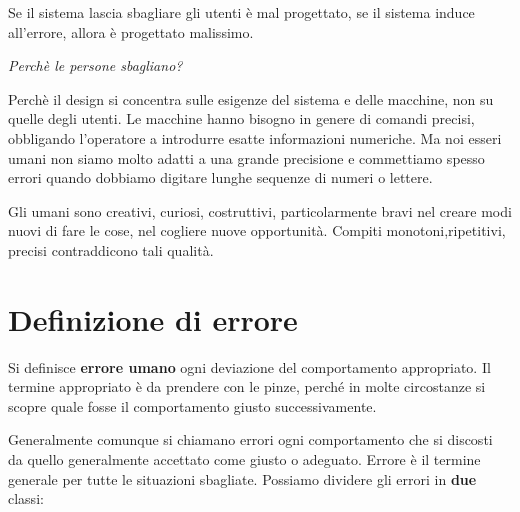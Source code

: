 \documentclass[a4paper,11pt,oneside]{book}
\begin{document}
Se il sistema lascia sbagliare gli utenti è mal progettato, se il sistema induce all'errore, allora è progettato malissimo.

\pagebreak

\begin{flushleft}
	\textit{Perchè le persone sbagliano?}
\end{flushleft}

Perchè il design si concentra sulle esigenze del sistema
e delle macchine, non su quelle degli utenti. Le macchine hanno bisogno in genere di
comandi precisi, obbligando l'operatore a introdurre esatte informazioni numeriche. Ma
noi esseri umani non siamo molto adatti a una grande precisione e commettiamo spesso
errori quando dobbiamo digitare lunghe sequenze di numeri o lettere.

Gli umani sono creativi, curiosi, costruttivi, particolarmente bravi nel creare modi nuovi di fare le cose, nel cogliere nuove opportunità. Compiti monotoni,ripetitivi, precisi contraddicono tali qualità.

\section{Definizione di errore}
Si definisce \textbf{errore umano} ogni deviazione del comportamento appropriato. Il termine appropriato è da prendere con le pinze, perché in molte circostanze si scopre quale fosse il comportamento giusto successivamente.

Generalmente comunque si chiamano errori ogni comportamento che si discosti da quello generalmente accettato come giusto o adeguato. Errore è il termine generale per tutte le situazioni sbagliate. Possiamo dividere gli errori in \textbf{due} classi:
\end{document}
